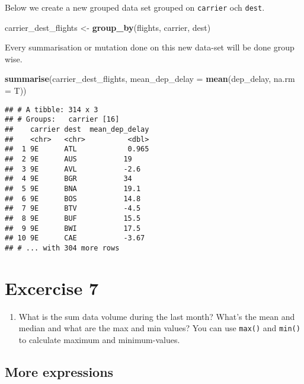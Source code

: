 \documentclass[]{book}
\newenvironment{Shaded}{\begin{snugshade}}{\end{snugshade}}
\newcommand{\DataTypeTok}[1]{\textcolor[rgb]{0.13,0.29,0.53}{#1}}
\newcommand{\KeywordTok}[1]{\textcolor[rgb]{0.13,0.29,0.53}{\textbf{#1}}}
\newcommand{\NormalTok}[1]{#1}
\newcommand{\StringTok}[1]{\textcolor[rgb]{0.31,0.60,0.02}{#1}}
\providecommand{\tightlist}{%
  \setlength{\itemsep}{0pt}\setlength{\parskip}{0pt}}
\begin{document}
Below we create a new grouped data set grouped on \texttt{carrier} och \texttt{dest}.

\begin{Shaded}
\begin{Highlighting}[]
\NormalTok{carrier_dest_flights <-}\StringTok{ }\KeywordTok{group_by}\NormalTok{(flights, carrier, dest)}
\end{Highlighting}
\end{Shaded}

Every summarisation or mutation done on this new data-set will be done group wise.

\begin{Shaded}
\begin{Highlighting}[]
\KeywordTok{summarise}\NormalTok{(carrier_dest_flights, }\DataTypeTok{mean_dep_delay =} \KeywordTok{mean}\NormalTok{(dep_delay, }\DataTypeTok{na.rm =}\NormalTok{ T))}
\end{Highlighting}
\end{Shaded}

\begin{verbatim}
## # A tibble: 314 x 3
## # Groups:   carrier [16]
##    carrier dest  mean_dep_delay
##    <chr>   <chr>          <dbl>
##  1 9E      ATL            0.965
##  2 9E      AUS           19    
##  3 9E      AVL           -2.6  
##  4 9E      BGR           34    
##  5 9E      BNA           19.1  
##  6 9E      BOS           14.8  
##  7 9E      BTV           -4.5  
##  8 9E      BUF           15.5  
##  9 9E      BWI           17.5  
## 10 9E      CAE           -3.67 
## # ... with 304 more rows
\end{verbatim}

\hypertarget{excercise-7}{%
\section{Excercise 7}\label{excercise-7}}

\begin{enumerate}
\def\labelenumi{\arabic{enumi}.}
\tightlist
\item
  What is the sum data volume during the last month? What's the mean and median and what are the max and min values? You can use \texttt{max()} and \texttt{min()} to calculate maximum and minimum-values.
\end{enumerate}

\hypertarget{more-expressions}{%
\subsection{More expressions}\label{more-expressions}}
\end{document}
